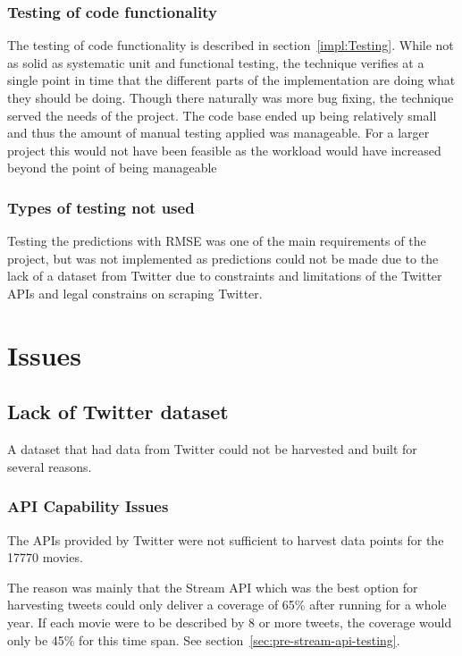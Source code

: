 \subsubsection{Testing of code functionality}
The testing of code functionality is described in section~\ref{impl:Testing}. While not as solid as systematic unit and functional testing, the technique verifies at a single point in time that the different parts of the implementation are doing what they should be doing. Though there naturally was more bug fixing, the technique served the needs of the project. The code base ended up being relatively small and thus the amount of manual testing applied was manageable. For a larger project this would not have been feasible as the workload would have increased beyond the point of being manageable

\subsubsection{Types of testing not used}
Testing the predictions with RMSE was one of the main requirements of the project, but was not implemented as predictions could not be made due to the lack of a dataset from Twitter due to constraints and limitations of the Twitter APIs and legal constrains on scraping Twitter.

\section{Issues}\label{sec:issues}

\subsection*{Lack of Twitter dataset}
A dataset that had data from Twitter could not be harvested and built for several reasons.

\subsubsection{API Capability Issues}
The APIs provided by Twitter were not sufficient to harvest data points for the 17770 movies.

The reason was mainly that the Stream API which was the best option for harvesting tweets could only deliver a coverage of 65\% after running for a whole year. If each movie were to be described by 8 or more tweets, the coverage would only be 45\% for this time span. See section~\ref{sec:pre-stream-api-testing}.


